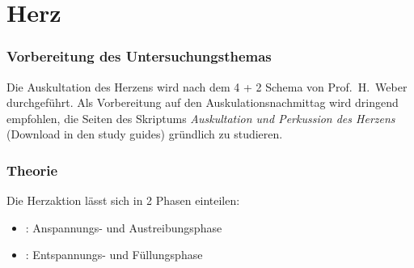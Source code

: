 \section{Herz}

\subsubsection{Vorbereitung des Untersuchungsthemas}

Die Auskultation des Herzens wird nach dem 4 + 2 Schema von
Prof.~H.~Weber durchgeführt. Als Vorbereitung auf den
Auskulationsnachmittag wird dringend empfohlen, die Seiten
 des Skriptums \emph{Auskultation und
Perkussion des Herzens} (Download in den study guides)
gründlich zu studieren. 

\subsubsection{Theorie}

{Die Herzaktion lässt sich in 2 Phasen einteilen: 

\begin{itemize}
  \item {}: Anspannungs- und Austreibungsphase
  \item {}: Entspannungs- und Füllungsphase 
\end{itemize}}



